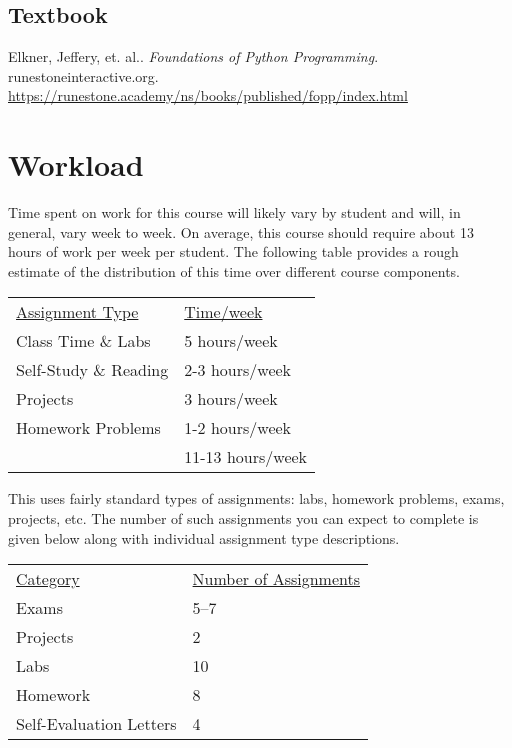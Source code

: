 \documentclass[10pt]{article}
\begin{document}
\subsection{Textbook}

\noindent
Elkner, Jeffery, et. al.. \textit{Foundations of Python Programming}.  runestoneinteractive.org. \url{https://runestone.academy/ns/books/published/fopp/index.html} %


\section{Workload}


Time spent on work for this course will likely vary by student and will, in general, vary week to week. On average, this course should require about 13 hours of work per week per student.  The following table provides a rough estimate of the distribution of this time over different course components.
\begin{center}
\begin{tabular}{ll}
\underline{Assignment Type} & \underline{Time/week} \\
Class Time \& Labs       & 5 hours/week \\
Self-Study \& Reading & 2-3 hours/week \\
Projects             & 3 hours/week \\
Homework Problems   & 1-2 hours/week \\
\bottomrule
 & 11-13 hours/week
\end{tabular}
\end{center}


This uses fairly standard types of assignments: labs, homework problems, exams, projects, etc. The number of such assignments you can expect to complete is given below along with individual assignment type descriptions.
\begin{center}
  \begin{tabular}{ll}
    \underline{Category} & \underline{Number of Assignments} \\
    Exams & 5--7 \\
    Projects & 2 \\
    Labs & 10 \\
    Homework & 8 \\
    Self-Evaluation Letters & 4 \\
  \end{tabular}
\end{center}
\end{document}
